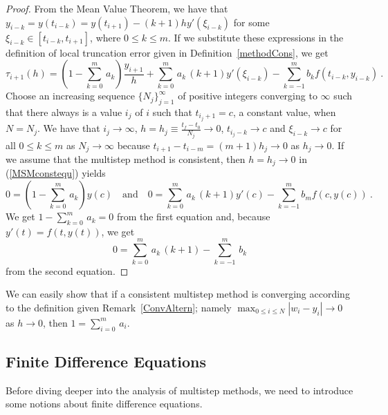 \begin{proof}
From the Mean Value Theorem, we have that $y_{i-k} = y(t_{i-k}) =
y(t_{i+1}) - (k+1)h y'(\xi_{i-k})$ for some $\xi_{i-k} \in [t_{i-k},t_{i+1}]$,
where $0 \leq k \leq m$.  If we substitute these expressions
in the definition of local truncation error given in
Definition~\ref{methodCons}, we get
\begin{equation}\label{MSMconstequ}
\tau_{i+1}(h) = \left(1-\sum_{k=0}^m\,a_k \right) \frac{y_{i+1}}{h}
+ \sum_{k=0}^m\,a_k\,(k+1)y'(\xi_{i-k})
- \sum_{k=-1}^m b_k f(t_{i-k},y_{i-k}) \ .
\end{equation}
Choose an increasing sequence $\{N_j\}_{j=1}^\infty$ of positive
integers converging to $\infty$ such that there always is a value
$i_j$ of $i$ such that $t_{i_j+1} = c$, a constant value, when $N= N_j$.
We have that $i_j \to \infty$,
$\displaystyle h = h_j \equiv \frac{t_f-t_0}{N_j} \to 0$,
$t_{i_j-k} \rightarrow c$ and $\xi_{i-k} \rightarrow c$ for all
$0 \leq k \leq m$ as $N_j\to \infty$ because
$t_{i+1}-t_{i-m} = (m+1)h_j \to 0$ as $h_j \to 0$.  If we assume that
the multistep method is consistent, then $h = h_j \to 0$ in
(\ref{MSMconstequ}) yields
\[
0 = \left(1-\sum_{k=0}^m\,a_k \right) y(c) \quad
\text{and} \quad 
0 = \sum_{k=0}^m\,a_k\,(k+1)y'(c) - \sum_{k=-1}^m b_m f(c,y(c)) \ .
\]
We get $\displaystyle 1-\sum_{k=0}^m\,a_k  = 0$ from the first equation and,
because $y'(t)=f(t,y(t))$, we get
\[
0 = \sum_{k=0}^m\,a_k\,(k+1) - \sum_{k=-1}^m \,b_k
\]
from the second equation.
\end{proof}

\begin{rmk}
We can easily show that if a consistent multistep method is converging
according to the definition given Remark~\ref{ConvAltern}; namely 
$\displaystyle \max_{0\leq i \leq N} |w_i -y_i| \to 0$ as $h \to 0$, then
$\displaystyle 1 = \sum_{i=0}^m\,a_i$.
\end{rmk}

\subsection{Finite Difference Equations}

Before diving deeper into the analysis of multistep methods, we need to
introduce some notions about finite difference equations.

